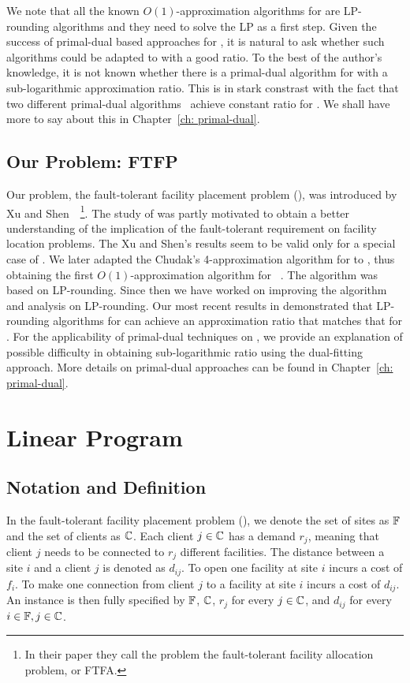 \documentclass[oneside,final]{ucr}
\begin{document}
We note that all the known $O(1)$-approximation algorithms
for {\FTFL} are LP-rounding algorithms and they need to
solve the LP as a first step. Given the success of
primal-dual based approaches for {\UFL}, it is natural to
ask whether such algorithms could be adapted to {\FTFL} with
a good ratio. To the best of the author's knowledge, it is
not known whether there is a primal-dual algorithm for
{\FTFL} with a sub-logarithmic approximation ratio. This is
in stark constrast with the fact that two different
primal-dual algorithms~\cite{JainV03,JainMMSV03} achieve
constant ratio for {\UFL}. We shall have more to say about
this in Chapter~\ref{ch: primal-dual}.

\section{Our Problem: FTFP}
Our problem, the fault-tolerant facility placement problem
(\FTFP), was introduced by Xu and
Shen~\cite{XuS09}~\footnote{In their paper they call the
  problem the fault-tolerant facility allocation problem, or
  FTFA.}. The study of {\FTFP} was partly motivated to
obtain a better understanding of the implication of the
fault-tolerant requirement on facility location
problems. The Xu and Shen's results seem to be valid only
for a special case of {\FTFP}. We later adapted the Chudak's
4-approximation algorithm for {\UFL} to {\FTFP}, thus
obtaining the first $O(1)$-approximation algorithm for
{\FTFP}~\cite{YanC11}. The algorithm was based on
LP-rounding. Since then we have worked on improving the
algorithm and analysis on LP-rounding. Our most recent
results in \cite{YanC13} demonstrated that LP-rounding
algorithms for {\FTFP} can achieve an approximation ratio
that matches that for {\UFL}. For the applicability of
primal-dual techniques on {\FTFP}, we provide an explanation
of possible difficulty in obtaining sub-logarithmic ratio
using the dual-fitting approach. More details on primal-dual
approaches can be found in Chapter~\ref{ch: primal-dual}.


\chapter{Linear Program} \label{ch:lp} 

\section{Notation and Definition}
In the fault-tolerant facility placement problem ({\FTFP}),
we denote the set of sites as $\mathbb{F}$ and the set of
clients as $\mathbb{C}$. Each client $j \in \mathbb{C}$ has
a demand $r_j$, meaning that client $j$ needs to be
connected to $r_j$ different facilities. The distance
between a site $i$ and a client $j$ is denoted as
$d_{ij}$. To open one facility at site $i$ incurs a cost of
$f_i$. To make one connection from client $j$ to a facility
at site $i$ incurs a cost of $d_{ij}$.  An {\FTFP} instance
is then fully specified by $\mathbb{F}$, $\mathbb{C}$, $r_j$
for every $j\in\mathbb{C}$, and $d_{ij}$ for every
$i\in\mathbb{F},j\in\mathbb{C}$.
\end{document}
